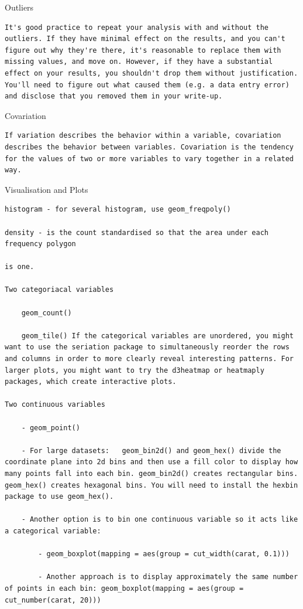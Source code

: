 \documentclass[
]{book}
\begin{document}
Outliers

\begin{verbatim}
It's good practice to repeat your analysis with and without the outliers. If they have minimal effect on the results, and you can't figure out why they're there, it's reasonable to replace them with missing values, and move on. However, if they have a substantial effect on your results, you shouldn't drop them without justification. You'll need to figure out what caused them (e.g. a data entry error) and disclose that you removed them in your write-up.
\end{verbatim}

Covariation

\begin{verbatim}
If variation describes the behavior within a variable, covariation describes the behavior between variables. Covariation is the tendency for the values of two or more variables to vary together in a related way.
\end{verbatim}

Visualisation and Plots

\begin{verbatim}
histogram - for several histogram, use geom_freqpoly()

density - is the count standardised so that the area under each frequency polygon

is one.

Two categoriacal variables

    geom_count()

    geom_tile() If the categorical variables are unordered, you might want to use the seriation package to simultaneously reorder the rows and columns in order to more clearly reveal interesting patterns. For larger plots, you might want to try the d3heatmap or heatmaply packages, which create interactive plots.

Two continuous variables

    - geom_point()

    - For large datasets:   geom_bin2d() and geom_hex() divide the coordinate plane into 2d bins and then use a fill color to display how many points fall into each bin. geom_bin2d() creates rectangular bins. geom_hex() creates hexagonal bins. You will need to install the hexbin package to use geom_hex().

    - Another option is to bin one continuous variable so it acts like a categorical variable:

        - geom_boxplot(mapping = aes(group = cut_width(carat, 0.1)))

        - Another approach is to display approximately the same number of points in each bin: geom_boxplot(mapping = aes(group = cut_number(carat, 20)))
\end{verbatim}
\end{document}
